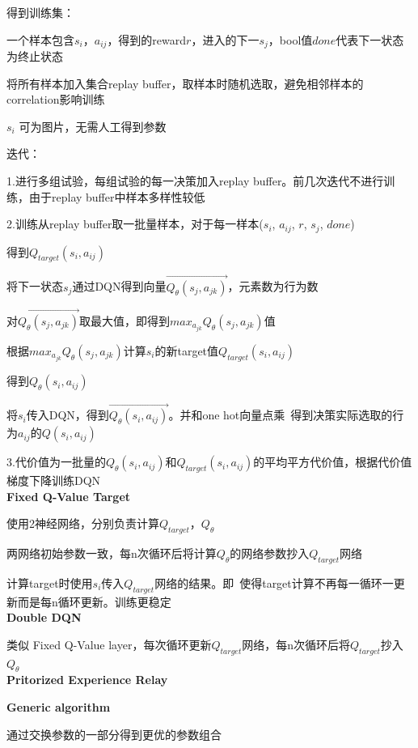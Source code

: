 \documentclass[UTF8]{ctexart}
\begin{document}
  得到训练集：

  \quad 一个样本包含$s_i$，$a_{ij}$，得到的reward$r$，进入的下一$s_j$，bool值$done$代表下一状态为终止状态

  \quad 将所有样本加入集合replay buffer，取样本时随机选取，避免相邻样本的correlation影响训练

  \quad $s_i$ 可为图片，无需人工得到参数
  
  迭代：
  
  \quad 1.进行多组试验，每组试验的每一决策加入replay buffer。前几次迭代不进行训练，由于replay buffer中样本多样性较低
  
  \quad 2.训练从replay buffer取一批量样本，对于每一样本($s_i$, $a_{ij}$, $r$, $s_j$, $done$)

  \quad \quad 得到$Q_{target}(s_i, a_{ij})$
  
  \quad \quad \quad 将下一状态$s_j$通过DQN得到向量$\vec{Q_{\theta}(s_j, a_{jk})}$，元素数为行为数

  \quad \quad \quad 对$\vec{Q_{\theta}(s_j, a_{jk})}$取最大值，即得到$max_{a_{jk}} Q_{\theta}(s_j, a_{jk})$值

  \quad \quad \quad 根据$max_{a_{jk}} Q_{\theta}(s_j, a_{jk})$计算$s_i$的新target值$Q_{target}(s_i, a_{ij})$

  \quad \quad 得到$Q_{\theta}(s_i, a_{ij})$

  \quad \quad \quad 将$s_i$传入DQN，得到$\vec{Q_{\theta}(s_i, a_{ij})}$。并和one hot向量点乘\ 得到决策实际选取的行为$a_{ij}$的$Q(s_i, a_{ij})$

  \quad 3.代价值为一批量的$Q_{\theta}(s_i, a_{ij})$和$Q_{target}(s_i, a_{ij})$的平均平方代价值，根据代价值梯度下降训练DQN\\
\textbf{Fixed Q-Value Target}

  使用2神经网络，分别负责计算$Q_{target}$，$Q_{\theta}$

  两网络初始参数一致，每n次循环后将计算$Q_{\theta}$的网络参数抄入$Q_{target}$网络

  计算target时使用$s_i$传入$Q_{target}$网络的结果。即\ 使得target计算不再每一循环一更新而是每n循环更新。训练更稳定\\
\textbf{Double DQN} 

  类似 Fixed Q-Value layer，每次循环更新$Q_{target}$网络，每n次循环后将$Q_{target}$抄入$Q_{\theta}$\\
\textbf{Pritorized Experience Relay}

  
\textbf{Generic algorithm}

  通过交换参数的一部分得到更优的参数组合
\end{document}
